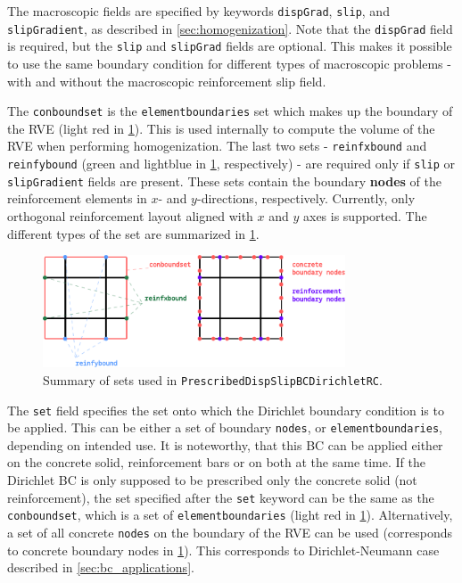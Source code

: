 \documentclass[11pt]{article}
\newcommand{\param}[1]{\texttt{#1}}
\begin{document}
The macroscopic fields are specified by keywords \param{dispGrad}, \param{slip}, and \param{slipGradient}, as described in \cref{sec:homogenization}. Note that the \param{dispGrad} field is required, but the \param{slip} and \param{slipGrad} fields are optional. This makes it possible to use the same boundary condition for different types of macroscopic problems - with and without the macroscopic reinforcement slip field.

The \param{conboundset} is the \param{elementboundaries} set which makes up the boundary of the RVE (light red in \cref{fig:dirichletsets}). This is used internally to compute the volume of the RVE when performing homogenization.
The last two sets - \param{reinfxbound} and \param{reinfybound} (green and lightblue in \cref{fig:dirichletsets}, respectively) - are required only if \param{slip} or \param{slipGradient} fields are present. These sets contain the boundary \textbf{nodes} of the reinforcement elements in $x$- and $y$-directions, respectively.
Currently, only orthogonal reinforcement layout aligned with $x$ and $y$ axes is supported.
The different types of the set are summarized in \cref{fig:dirichletsets}.

\begin{figure}[H]
    \centering
    \includegraphics[width=0.8\textwidth]{img/dirichletsets.pdf}
    \caption{Summary of sets used in \param{PrescribedDispSlipBCDirichletRC}.}
    \label{fig:dirichletsets}
\end{figure}

The \param{set} field specifies the set onto which the Dirichlet boundary condition is to be applied. 
This can be either a set of boundary \param{nodes}, or \param{elementboundaries}, depending on intended use. 
It is noteworthy, that this BC can be applied either on the concrete solid, reinforcement bars or on both at the same time.
If the Dirichlet BC is only supposed to be prescribed only the concrete solid (not reinforcement), the set specified after the \param{set} keyword can be the same as the \param{conboundset}, which is a set of \param{elementboundaries} (light red in \cref{fig:dirichletsets}). Alternatively, a set of all concrete \param{nodes} on the boundary of the RVE can be used (corresponds to concrete boundary nodes in \cref{fig:dirichletsets}). This corresponds to Dirichlet-Neumann case described in \cref{sec:bc_applications}.
\end{document}
